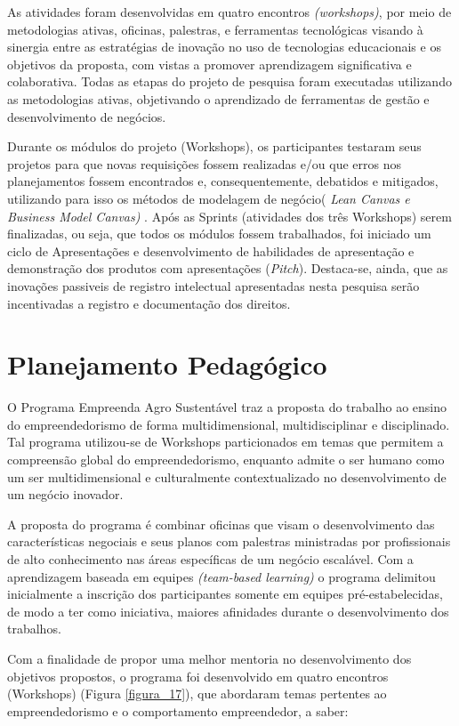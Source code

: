 As atividades foram desenvolvidas em quatro encontros \textit{(workshops)}, por meio de metodologias ativas, oficinas, palestras, e ferramentas tecnológicas visando à sinergia entre as estratégias de inovação no uso de tecnologias educacionais e os objetivos da proposta, com vistas a promover aprendizagem significativa  e colaborativa. Todas as etapas do projeto de pesquisa foram executadas utilizando as metodologias ativas, objetivando o aprendizado de ferramentas de gestão e desenvolvimento de negócios. 

Durante os módulos do projeto (Workshops), os participantes testaram seus projetos para que novas requisições fossem realizadas e/ou que erros nos planejamentos fossem encontrados e, consequentemente, debatidos e mitigados, utilizando para isso os métodos de modelagem de negócio( \textit{Lean Canvas e Business Model Canvas)} . Após as Sprints (atividades dos três Workshops) serem finalizadas, ou seja, que todos os módulos fossem trabalhados, foi iniciado um ciclo de Apresentações e desenvolvimento de habilidades de apresentação e demonstração dos produtos com apresentações (\textit{Pitch}). Destaca-se, ainda, que as inovações passiveis de registro intelectual apresentadas nesta pesquisa serão incentivadas a registro e documentação dos direitos.


\section{Planejamento Pedagógico}

O Programa Empreenda Agro Sustentável traz a proposta do trabalho ao ensino do empreendedorismo de forma multidimensional, multidisciplinar e disciplinado. Tal programa utilizou-se de Workshops particionados em temas que permitem a compreensão global do empreendedorismo, enquanto admite o ser humano como um ser multidimensional e culturalmente contextualizado no desenvolvimento de um negócio inovador. 

A proposta do programa é combinar oficinas que visam o desenvolvimento das características negociais e seus planos com palestras ministradas por profissionais de alto conhecimento nas áreas específicas de um negócio escalável. Com a aprendizagem baseada em equipes \textit{(team-based learning)} o programa delimitou inicialmente a inscrição dos participantes somente em equipes pré-estabelecidas, de modo a ter como iniciativa, maiores afinidades durante o desenvolvimento dos trabalhos. 

Com a finalidade de propor uma melhor mentoria no desenvolvimento dos objetivos propostos, o programa foi desenvolvido em quatro encontros (Workshops) (Figura \ref{figura_17}), que abordaram temas pertentes ao empreendedorismo e o comportamento empreendedor, a saber:

